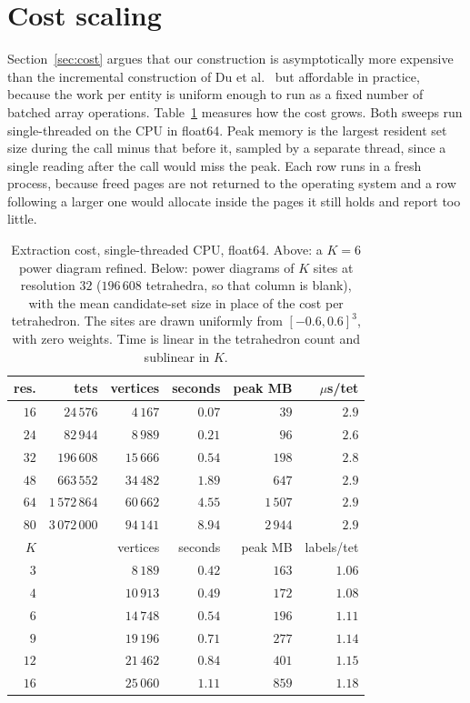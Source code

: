 \documentclass[11pt]{article}
\theoremstyle{definition}
\begin{document}
\section{Cost scaling}
\label{sec:scaling-supp}

Section~\ref{sec:cost} argues that our construction is asymptotically more
expensive than the incremental construction of Du et al.~\cite{du2022} but
affordable in practice, because the work per entity is uniform enough to run
as a fixed number of batched array operations. Table~\ref{tab:scaling}
measures how the cost grows. Both sweeps run single-threaded on the CPU in
float64. Peak memory is the largest resident set size during the call minus
that before it, sampled by a separate thread, since a single reading after
the call would miss the peak. Each row runs in a fresh process, because freed
pages are not returned to the operating system and a row following a larger
one would allocate inside the pages it still holds and report too little.

\begin{table}[htbp]
\centering
\small
\caption{Extraction cost, single-threaded CPU, float64. Above: a $K=6$ power
diagram refined. Below: power diagrams of $K$ sites at resolution
$32$ ($196\,608$ tetrahedra, so that column is blank), with the mean
candidate-set size in place of the cost per tetrahedron. The sites are drawn
uniformly from $[-0.6, 0.6]^3$, with zero weights. Time is linear in
the tetrahedron count and sublinear in $K$.}
\label{tab:scaling}
\begin{tabular}{@{}rrrrrr@{}}
\toprule
res. & tets & vertices & seconds & peak MB & $\mu$s/tet \\
\midrule
$16$ & $24\,576$    & $4\,167$  & $0.07$  & $39$    & $2.9$ \\
$24$ & $82\,944$    & $8\,989$  & $0.21$  & $96$    & $2.6$ \\
$32$ & $196\,608$   & $15\,666$ & $0.54$  & $198$   & $2.8$ \\
$48$ & $663\,552$   & $34\,482$ & $1.89$  & $647$   & $2.9$ \\
$64$ & $1\,572\,864$& $60\,662$ & $4.55$  & $1\,507$& $2.9$ \\
$80$ & $3\,072\,000$& $94\,141$ & $8.94$  & $2\,944$& $2.9$ \\
\midrule
$K$ & & vertices & seconds & peak MB & labels/tet \\
\midrule
$3$  & & $8\,189$  & $0.42$ & $163$ & $1.06$ \\
$4$  & & $10\,913$ & $0.49$ & $172$ & $1.08$ \\
$6$  & & $14\,748$ & $0.54$ & $196$ & $1.11$ \\
$9$  & & $19\,196$ & $0.71$ & $277$ & $1.14$ \\
$12$ & & $21\,462$ & $0.84$ & $401$ & $1.15$ \\
$16$ & & $25\,060$ & $1.11$ & $859$ & $1.18$ \\
\bottomrule
\end{tabular}
\end{table}
\end{document}
